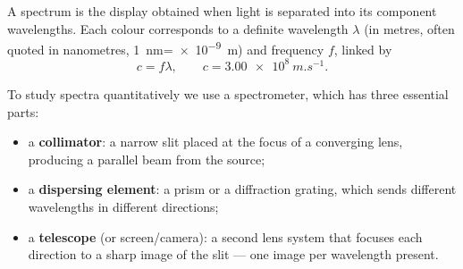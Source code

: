 \documentclass[11pt]{article}
\newcommand{\cle}[1]{{\popxbold\color{popdark}#1}}
\begin{document}
\begin{definition}
A \cle{spectrum} is the display obtained when light is separated into its component wavelengths. Each colour corresponds to a definite wavelength $\lambda$ (in metres, often quoted in nanometres, \SI{1}{nm}=\SI{e-9}{m}) and frequency $f$, linked by
\[ c = f\lambda, \qquad c = \SI{3.00e8}{m.s^{-1}}. \]
\end{definition}

To study spectra quantitatively we use a \cle{spectrometer}, which has three essential parts:

\begin{itemize}
\item a \textbf{collimator}: a narrow slit placed at the focus of a converging lens, producing a parallel beam from the source;
\item a \textbf{dispersing element}: a prism or a diffraction grating, which sends different wavelengths in different directions;
\item a \textbf{telescope} (or screen/camera): a second lens system that focuses each direction to a sharp image of the slit — one image per wavelength present.
\end{itemize}
\end{document}
